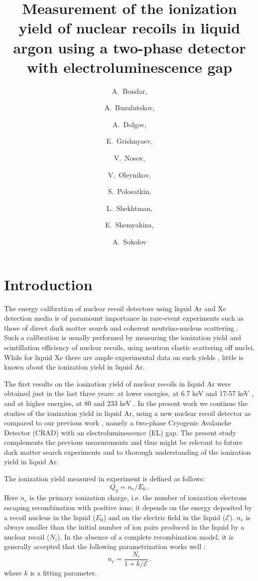 \documentclass[a4paper,11pt]{article}
\title{\boldmath Measurement of the ionization yield of nuclear recoils in liquid argon using a two-phase detector with electroluminescence gap}
\author[a,b]{A.~Bondar,}
\author[a,b]{A.~Buzulutskov,}
\author[b]{A.~Dolgov,}
\author[a]{E.~Grishnyaev,}
\author[a,b]{V.~Nosov,}
\author[a,b,1]{V.~Oleynikov,\note{Corresponding author.}}
\author[a,c]{S.~Polosatkin,}
\author[a,b]{L.~Shekhtman,}
\author[a,b]{E.~Shemyakina,}
\author[a,b]{A.~Sokolov}
\affiliation[a]{Budker Institute of Nuclear Physics, \\Lavrentiev ave. 11, Novosibirsk 630090, Russia}
\affiliation[b]{Novosibirsk State University,\\ Pirogova st. 2, Novosibirsk 630090, Russia}
\affiliation[c]{Novosibirsk State Technical University,\\ Karl Marx st. 20, Novosibirsk 630073, Russia}
\begin{document}
\maketitle
\flushbottom

\section{Introduction}
The energy calibration of nuclear recoil detectors using liquid Ar and Xe detection media is of paramount importance in rare-event experiments
such as those of direct dark matter search and coherent neutrino-nucleus scattering \cite{NobleRev}. Such a calibration is usually performed by measuring the ionization yield and scintillation efficiency of nuclear recoils, using neutron elastic scattering off nuclei. While for liquid Xe there are ample experimental data on such yields \cite{LXeYield1,LXeYield2,LXeYield3}, little is known  about the ionization yield in liquid Ar.

The first results on the ionization yield of nuclear
recoils in liquid Ar were obtained just in the last three years: at lower energies, at 6.7 keV \cite{Joshi} and 17-57 keV \cite{Cao}, and at higher energies, at 80 and 233 keV \cite{IonYield14}. In the present work we continue the studies of the ionization yield in liquid Ar, using a new nuclear recoil detector as compared to our previous work \cite{IonYield14}, namely a two-phase Cryogenic Avalanche Detector (CRAD) with an electroluminescence (EL) gap. The present study complements the previous measurements and thus might be relevant to future dark matter search experiments \cite{ArDM,Darkside} and to thorough understanding of the ionization yield in liquid Ar.

The ionization yield measured in experiment is defined as follows:
\begin{equation}
\label{eq.1} Q_y=n_e/E_0 \,.
\end{equation}
Here  $n_e$ is the primary ionization charge, i.e. the number of ionization electrons escaping recombination with
positive ions; it depends on the energy deposited by a recoil
nucleus in the liquid ($E_0$) and on the electric field in the
liquid ($\mathcal{E}$). $n_e$  is always smaller than the initial
number of ion pairs produced in the liquid by a nuclear recoil
($N_i$). In the absence of a complete recombination model, it is
generally accepted that the following parametrization
works well \cite{NobleRev}:
\begin{equation}
\label{eq.2} n_e=\frac{N_i}{1 + k/\mathcal{E}} \,.
\end{equation}
where $k$ is a fitting parameter.
\end{document}
